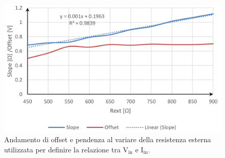 \begin{figure}
\centering
\includegraphics[width=\textwidth]{Immagini/R3Karagounis}
\caption{Andamento di offset e pendenza al variare della resistenza esterna utilizzata per definire la relazione tra $\mathrm{V_{in}}$ e $\mathrm{I_{in}}$.}%
\label{R3Karagounis}
\end{figure}

